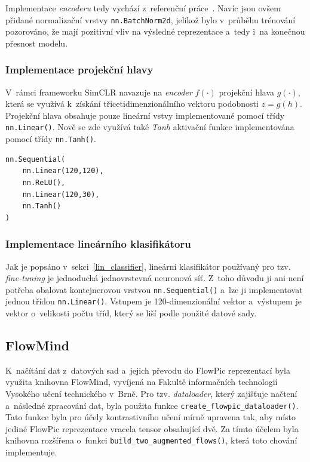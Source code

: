 Implementace \textit{encoderu} tedy vychází z~referenční práce~\cite{flowpic_augmentations}. Navíc jsou ovšem přidané normalizační vrstvy \texttt{nn.BatchNorm2d}, jelikož bylo v~průběhu trénování pozorováno, že mají pozitivní vliv na výsledné reprezentace a~tedy i~na konečnou přesnost modelu.

\subsubsection*{Implementace projekční hlavy}
V~rámci frameworku SimCLR navazuje na \textit{encoder} $f(\cdot)$ projekční hlava $g(\cdot)$, která se využívá k~získání třicetidimenzionálního vektoru podobnosti $z = g(h)$. Projekční hlava obsahuje pouze lineární vstvy implementované pomocí třídy \texttt{nn.Linear()}. Nově se zde využívá také \textit{Tanh} aktivační funkce implementována pomocí třídy \texttt{nn.Tanh()}.
\begin{lstlisting}[caption={Implementace projekční hlavy $g(\cdot)$.}]
nn.Sequential(
    nn.Linear(120,120),
    nn.ReLU(),
    nn.Linear(120,30),
    nn.Tanh()
)
\end{lstlisting}

\subsubsection*{Implementace lineárního klasifikátoru}
Jak je popsáno v~sekci~\ref{lin_classifier}, lineární klasifikátor používaný pro tzv. \textit{fine-tuning} je jednoduchá jednovrstevná neuronová síť. Z~toho důvodu ji ani není potřeba obalovat kontejnerovou vrstvou \texttt{nn.Sequential()} a~lze ji implementovat jednou třídou \texttt{nn.Linear()}. Vstupem je 120-dimenzionální vektor a~výstupem je vektor o~velikosti počtu tříd, který se liší podle použité datové sady.

\subsection{FlowMind}
K~načítání dat z~datových sad a~jejich převodu do FlowPic reprezentací byla využita knihovna FlowMind, vyvíjená na Fakultě informačních technologií Vysokého učení technického v~Brně. Pro tzv. \textit{dataloader}, který zajišťuje načtení a~následné zpracování dat, byla použita funkce \texttt{create\_flowpic\_dataloader()}. Tato funkce byla pro účely kontrastivního učení mírně upravena tak, aby místo jediné FlowPic reprezentace vracela tensor obsahující dvě. Za tímto účelem byla knihovna rozšířena o~funkci \texttt{build\_two\_augmented\_flows()}, která toto chování implementuje.

